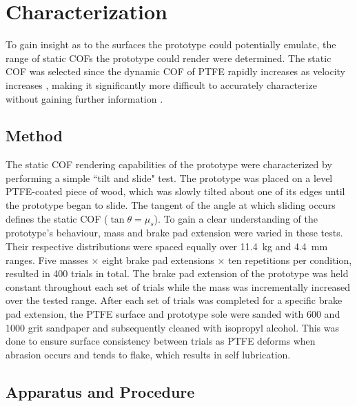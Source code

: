 \documentclass [12pt,letterpaper]{report}
\begin{document}
\section{Characterization}
\label{characterization}

To gain insight as to the surfaces the prototype could potentially emulate, the range of static COFs the prototype could render were determined. The static COF was selected since the dynamic COF of PTFE rapidly increases as velocity increases \cite{Dupont1996}, making it significantly more difficult to accurately characterize without gaining further information .


\subsection{Method}

The static COF rendering capabilities of the prototype were characterized by performing a simple ``tilt and slide" test. The prototype was placed on a level PTFE-coated piece of wood, which was slowly tilted about one of its edges until the prototype began to slide. The tangent of the angle at which sliding occurs defines the static COF ($\tan\theta=\mu_s$). To gain a clear understanding of the prototype's behaviour, mass and brake pad extension were varied in these tests. Their respective distributions were spaced equally over 11.4~kg and 4.4~mm ranges. Five masses $\times$ eight brake pad extensions $\times$ ten repetitions per condition, resulted in 400 trials in total. The brake pad extension of the prototype was held constant throughout each set of trials while the mass was incrementally increased over the tested range. After each set of trials was completed for a specific brake pad extension, the PTFE surface and prototype sole were sanded with 600 and 1000 grit sandpaper and subsequently cleaned with isopropyl alcohol.  This was done to ensure surface consistency between trials as PTFE deforms when abrasion occurs and tends to flake, which results in self lubrication.


\subsection{Apparatus and Procedure}
\end{document}
